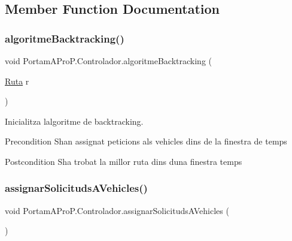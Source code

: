 \subsection{Member Function Documentation}
\mbox{\label{class_portam_a_pro_p_1_1_controlador_ac27d24bc80d3ac8023ae7a84b2e2c19d}} 
\subsubsection{\texorpdfstring{algoritme\+Backtracking()}{algoritmeBacktracking()}}
{\footnotesize\ttfamily void Portam\+A\+Pro\+P.\+Controlador.\+algoritme\+Backtracking (\begin{DoxyParamCaption}\item[{\hyperlink{class_portam_a_pro_p_1_1_ruta}{Ruta}}]{r }\end{DoxyParamCaption})}



Inicialitza l\textquotesingle{}algoritme de backtracking. 

\begin{DoxyPrecond}{Precondition}
S\textquotesingle{}han assignat peticions als vehicles dins de la finestra de temps 
\end{DoxyPrecond}
\begin{DoxyPostcond}{Postcondition}
S\textquotesingle{}ha trobat la millor ruta dins d\textquotesingle{}una finestra temps 
\end{DoxyPostcond}
\mbox{\label{class_portam_a_pro_p_1_1_controlador_a018e4628c51d9664ee54d5a125f59a61}} 
\subsubsection{\texorpdfstring{assignar\+Solicituds\+A\+Vehicles()}{assignarSolicitudsAVehicles()}}
{\footnotesize\ttfamily void Portam\+A\+Pro\+P.\+Controlador.\+assignar\+Solicituds\+A\+Vehicles (\begin{DoxyParamCaption}{ }\end{DoxyParamCaption})}



